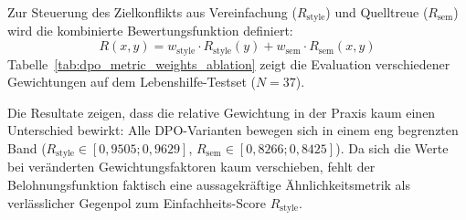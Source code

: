 Zur Steuerung des Zielkonflikts aus Vereinfachung ($R_{\text{style}}$) und Quelltreue ($R_{\text{sem}}$) wird die kombinierte Bewertungsfunktion definiert:
\begin{equation}
    R(x, y) = w_{\text{style}} \cdot R_{\text{style}}(y) + w_{\text{sem}} \cdot R_{\text{sem}}(x, y)
\end{equation}
Tabelle~\ref{tab:dpo_metric_weights_ablation} zeigt die Evaluation verschiedener Gewichtungen auf dem Lebenshilfe-Testset ($N=37$).

\begin{table}[htbp]
\centering
\small
\caption[Untersuchung der Gewichtung bei der kombinierten Bewertung auf dem Lebenshilfe-Testset]{Untersuchung der Gewichtung bei der kombinierten Bewertung für die direkte Präferenzoptimierung (Direct Preference Optimization, DPO) im Vergleich zur Basislinie des überwachten Feintunings (Supervised Fine-Tuning, SFT) auf dem Lebenshilfe-Testset ($N=37$ Artikelpaare) unter Gegenüberstellung von Einfachheits-Score ($R_{\text{style}}$), Quellähnlichkeit ($R_{\text{sem}}$), Referenztreue ($\text{Sim}_{\text{ref}}$), BLEU, ROUGE-L und Satzabbruchquote (Truncation).}
\label{tab:dpo_metric_weights_ablation}
\end{table}

Die Resultate zeigen, dass die relative Gewichtung in der Praxis kaum einen Unterschied bewirkt: Alle DPO-Varianten bewegen sich in einem eng begrenzten Band ($R_{\text{style}} \in [0{,}9505; 0{,}9629]$, $R_{\text{sem}} \in [0{,}8266; 0{,}8425]$). Da sich die Werte bei veränderten Gewichtungsfaktoren kaum verschieben, fehlt der Belohnungsfunktion faktisch eine aussagekräftige Ähnlichkeitsmetrik als verlässlicher Gegenpol zum Einfachheits-Score $R_{\text{style}}$.

